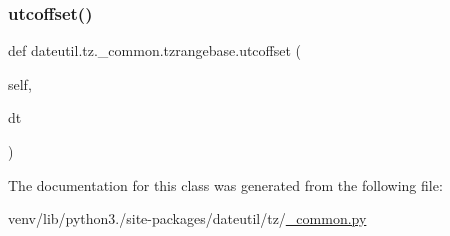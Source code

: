 \mbox{\label{classdateutil_1_1tz_1_1__common_1_1tzrangebase_a34a480a4f72d926e9cf84d734aca45ce}} 
\subsubsection{\texorpdfstring{utcoffset()}{utcoffset()}}
{\footnotesize\ttfamily def dateutil.\+tz.\+\_\+common.\+tzrangebase.\+utcoffset (\begin{DoxyParamCaption}\item[{}]{self,  }\item[{}]{dt }\end{DoxyParamCaption})}



The documentation for this class was generated from the following file\+:\begin{DoxyCompactItemize}
\item 
venv/lib/python3./site-\/packages/dateutil/tz/\hyperlink{tz_2__common_8py}{\+\_\+common.\+py}\end{DoxyCompactItemize}
